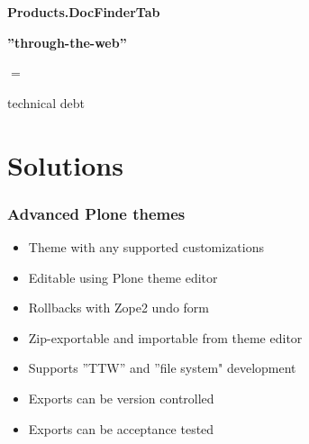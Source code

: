 \documentclass[aspectratio=43]{beamer}
\begin{document}
\begin{frame}[plain,c]
  \huge
  \bfseries
  \centering
  \vspace{1cm}
  Products.DocFinderTab
\end{frame}

\begin{frame}[plain,t]
  \vspace{8em}
  \huge
  \bfseries
  \centering
  ”through-the-web”
  \par
  $=$
  \par
  technical debt
\end{frame}

\section{Solutions}

\begin{frame}[plain,t]
  \frametitle{Advanced Plone themes}
  \vspace{1em}
  \begin{itemize}[<+->]
  \setlength{\itemsep}{1em}
  \item Theme with any supported customizations
  \item Editable using Plone theme editor
  \item Rollbacks with Zope2 undo form
  \item Zip-exportable and importable from theme editor
  \item Supports ”TTW” and ”file system" development
  \item Exports can be version controlled
  \item Exports can be acceptance tested
  \end{itemize}
\end{frame}
\end{document}
